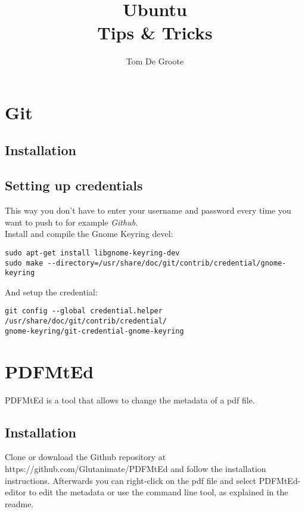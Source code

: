 \documentclass[a4paper]{article}
\title{Ubuntu \\
		Tips \& Tricks}
\author{Tom De Groote}
\begin{document}
\maketitle
\tableofcontents
\pagebreak


\section{Git}
\subsection{Installation}

\subsection{Setting up credentials}
This way you don't have to enter your username and password every time you want to push to for example \emph{Github}.
\\
Install and compile the Gnome Keyring devel:
\begin{lstlisting}
sudo apt-get install libgnome-keyring-dev
sudo make --directory=/usr/share/doc/git/contrib/credential/gnome-keyring
\end{lstlisting}

\noindent And setup the credential:
\begin{lstlisting}
git config --global credential.helper /usr/share/doc/git/contrib/credential/
gnome-keyring/git-credential-gnome-keyring
\end{lstlisting}

\section{PDFMtEd}
PDFMtEd is a tool that allows to change the metadata of a pdf file. 
\subsection{Installation}
Clone or download the Github repository at https://github.com/Glutanimate/PDFMtEd and follow the installation instructions. Afterwards you can right-click on the pdf file and select PDFMtEd-editor to edit the metadata or use the command line tool, as explained in the readme.
\end{document}
